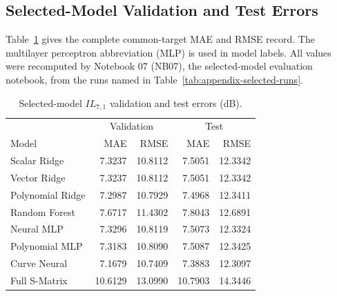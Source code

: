 \subsection{Selected-Model Validation and Test Errors}
Table~\ref{tab:appendix-s7-errors} gives the complete common-target MAE and RMSE
record. The multilayer perceptron abbreviation (MLP) is used in model labels.
All values were recomputed by Notebook 07 (NB07), the selected-model evaluation
notebook, from the runs named in Table~\ref{tab:appendix-selected-runs}.

\begin{table}[t]
    \caption{Selected-model $IL_{7,1}$ validation and test errors (dB).}
    \label{tab:appendix-s7-errors}
    \centering
    \begin{tabular}{@{}lrrrr@{}}
        \toprule
        & \multicolumn{2}{c}{Validation} & \multicolumn{2}{c}{Test} \\
        Model & MAE & RMSE & MAE & RMSE \\
        \midrule
        Scalar Ridge     &  7.3237 & 10.8112 &  7.5051 & 12.3342 \\
        Vector Ridge     &  7.3237 & 10.8112 &  7.5051 & 12.3342 \\
        Polynomial Ridge &  7.2987 & 10.7929 &  7.4968 & 12.3411 \\
        Random Forest    &  7.6717 & 11.4302 &  7.8043 & 12.6891 \\
        Neural MLP       &  7.3296 & 10.8119 &  7.5073 & 12.3324 \\
        Polynomial MLP   &  7.3183 & 10.8090 &  7.5087 & 12.3425 \\
        Curve Neural     &  7.1679 & 10.7409 &  7.3883 & 12.3097 \\
        Full S-Matrix    & 10.6129 & 13.0990 & 10.7903 & 14.3446 \\
        \bottomrule
    \end{tabular}
\end{table}

